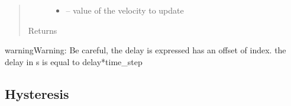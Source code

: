 \documentclass[letterpaper,10pt,english]{sphinxmanual}
\begin{document}
\begin{fulllineitems}
\begin{fulllineitems}
\begin{quote}
\begin{description}
\begin{itemize}
\item {} 
 -- value of the velocity to update

\end{itemize}

\item[{Returns}] \leavevmode


\end{description}\end{quote}

\end{fulllineitems}


\end{fulllineitems}


\begin{sphinxadmonition}{warning}{Warning:}
Be careful, the delay is expressed has an offset of index. the delay in s is equal to delay*time\_step
\end{sphinxadmonition}


\subsection{Hysteresis}
\label{\detokenize{package1:hysteresis}}\label{\detokenize{package1:module-Hysteresis}}
\end{document}
